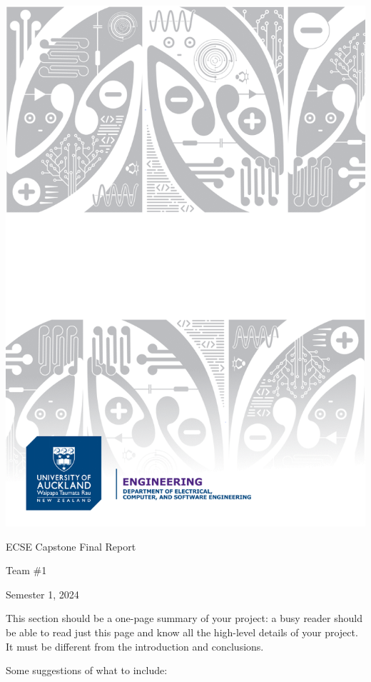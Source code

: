 \documentclass{capstone}
\begin{document}
\titlepage
	{\includegraphics[width=\paperwidth]{ecse-decal-title}}
	{
		\centering
		{\Large ECSE Capstone Final Report\par}
		\vspace{16pt} 
		{Team \#1\par} 
		\vspace{16pt}
		{Semester 1, 2024\par} 
	}

\tableofcontents
\newpage

This section should be a one-page summary of your project: a busy reader should be able to read just this page and know all the high-level details of your project. It must be different from the introduction and conclusions.

Some suggestions of what to include:
\end{document}
